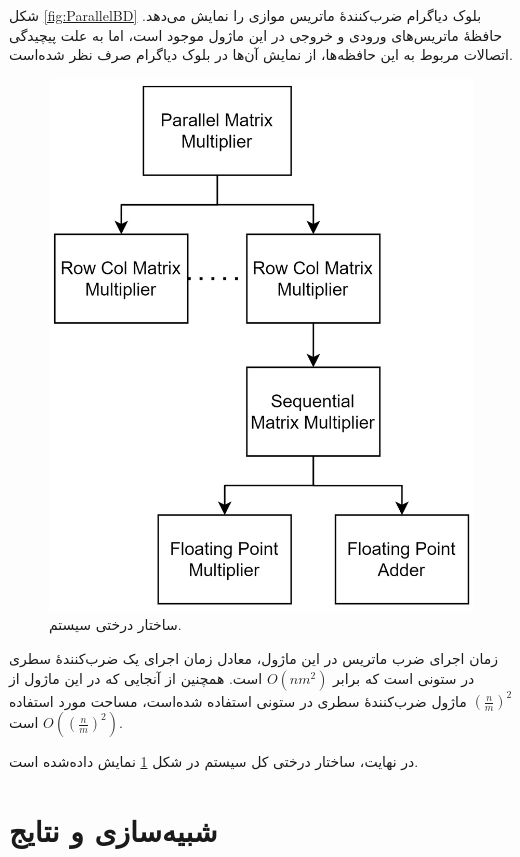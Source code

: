 \documentclass[conference]{IEEEtran-ModifiedForMVIP}
\begin{document}
شکل
\ref{fig:ParallelBD}
بلوک دیاگرام ضرب‌کنندهٔ ماتریس موازی را نمایش می‌دهد.
حافظهٔ ماتریس‌های ورودی و خروجی در این ماژول موجود است، اما به علت پیچیدگی اتصالات مربوط به این حافظه‌ها، از نمایش آن‌ها در بلوک دیاگرام صرف نظر شده‌است. 

\begin{figure}[t]
\centering 
\includegraphics[width=\linewidth]{Images/HierarchicalTree.png}
\caption{
\centering
ساختار درختی سیستم.
}\label{fig:HierarchicalTree}
\end{figure}

زمان اجرای ضرب ماتریس در این ماژول، معادل زمان اجرای یک ضرب‌کنندهٔ سطری در ستونی است که برابر
$O(nm^2)$
است. همچنین از آنجایی که در این ماژول از 
$(\frac{n}{m})^2$
ماژول ضرب‌کنندهٔ سطری در ستونی استفاده شده‌است، مساحت مورد استفاده
$O((\frac{n}{m})^2)$
است.

در نهایت، ساختار درختی کل سیستم در شکل
\ref{fig:HierarchicalTree}
نمایش داده‌شده است.

\section{شبیه‌سازی و نتایج}
\end{document}
